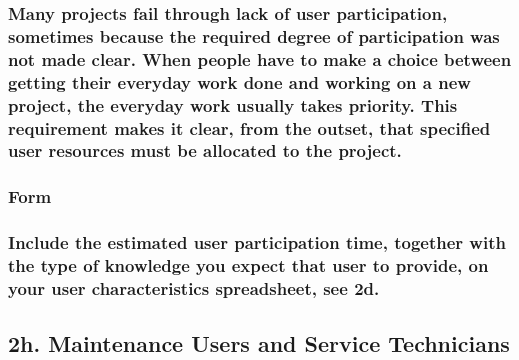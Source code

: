 \documentclass[
]{article}
\begin{document}
\hypertarget{many-projects-fail-through-lack-of-user-participation-sometimes-because-the-required-degree-of-participation-was-not-made-clear.-when-people-have-to-make-a-choice-between-getting-their-everyday-work-done-and-working-on-a-new-project-the-everyday-work-usually-takes-priority.-this-requirement-makes-it-clear-from-the-outset-that-specified-user-resources-must-be-allocated-to-the-project.}{%
\subsubsection{Many projects fail through lack of user participation,
sometimes because the required degree of participation was not made
clear. When people have to make a choice between getting their everyday
work done and working on a new project, the everyday work usually takes
priority. This requirement makes it clear, from the outset, that
specified user resources must be allocated to the
project.}\label{many-projects-fail-through-lack-of-user-participation-sometimes-because-the-required-degree-of-participation-was-not-made-clear.-when-people-have-to-make-a-choice-between-getting-their-everyday-work-done-and-working-on-a-new-project-the-everyday-work-usually-takes-priority.-this-requirement-makes-it-clear-from-the-outset-that-specified-user-resources-must-be-allocated-to-the-project.}}

\hypertarget{form-8}{%
\subsubsection{Form}\label{form-8}}

\hypertarget{include-the-estimated-user-participation-time-together-with-the-type-of-knowledge-you-expect-that-user-to-provide-on-your-user-characteristics-spreadsheet-see-2d.}{%
\subsubsection{Include the estimated user participation time, together
with the type of knowledge you expect that user to provide, on your user
characteristics spreadsheet, see
2d.}\label{include-the-estimated-user-participation-time-together-with-the-type-of-knowledge-you-expect-that-user-to-provide-on-your-user-characteristics-spreadsheet-see-2d.}}

\hypertarget{h.-maintenance-users-and-service-technicians}{%
\subsection{2h. Maintenance Users and Service
Technicians}\label{h.-maintenance-users-and-service-technicians}}
\end{document}
